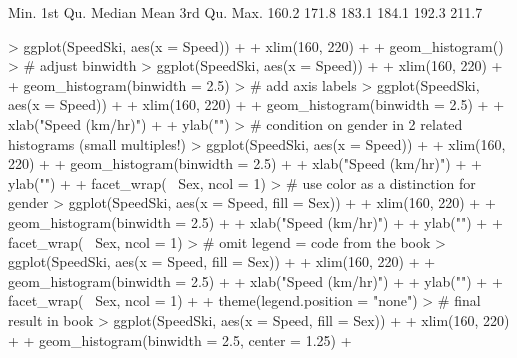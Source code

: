 \documentclass[12pt,letterpaper,final]{article}
\begin{document}
\begin{Schunk}
\begin{Soutput}
   Min. 1st Qu.  Median    Mean 3rd Qu.    Max. 
  160.2   171.8   183.1   184.1   192.3   211.7 
\end{Soutput}
\begin{Sinput}
> ggplot(SpeedSki, aes(x = Speed)) +
+   xlim(160, 220) +
+   geom_histogram()
> # adjust binwidth
> ggplot(SpeedSki, aes(x = Speed)) +
+   xlim(160, 220) +
+   geom_histogram(binwidth = 2.5)
> # add axis labels
> ggplot(SpeedSki, aes(x = Speed)) +
+   xlim(160, 220) + 
+   geom_histogram(binwidth = 2.5) +
+   xlab("Speed (km/hr)") + 
+   ylab("")
> # condition on gender in 2 related histograms (small multiples!)
> ggplot(SpeedSki, aes(x = Speed)) +
+   xlim(160, 220) + 
+   geom_histogram(binwidth = 2.5) +
+   xlab("Speed (km/hr)") + 
+   ylab("") +
+   facet_wrap(~ Sex, ncol = 1)
> # use color as a distinction for gender
> ggplot(SpeedSki, aes(x = Speed, fill = Sex)) +
+   xlim(160, 220) + 
+   geom_histogram(binwidth = 2.5) +
+   xlab("Speed (km/hr)") + 
+   ylab("") +
+   facet_wrap(~ Sex, ncol = 1)
> # omit legend = code from the book
> ggplot(SpeedSki, aes(x = Speed, fill = Sex)) +
+   xlim(160, 220) + 
+   geom_histogram(binwidth = 2.5) +
+   xlab("Speed (km/hr)") + 
+   ylab("") +
+   facet_wrap(~ Sex, ncol = 1) +
+   theme(legend.position = "none")
> # final result in book
> ggplot(SpeedSki, aes(x = Speed, fill = Sex)) + 
+   xlim(160, 220) +
+   geom_histogram(binwidth = 2.5, center = 1.25) + 

\end{Sinput}
\end{Schunk}
\end{document}
